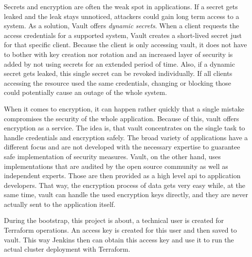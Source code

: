 Secrets and encryption are often the weak spot in applications.
If a secret gets leaked and the leak stays unnoticed, attackers could gain long term access to a system.
As a solution, Vault offers \emph{dynamic secrets}.
When a client requests the access credentials for a supported system, Vault creates a short-lived secret just for that specific client.
Because the client is only accessing vault, it does not have to bother with key creation nor rotation and an increased layer of security is added by not using secrets for an extended period of time.
Also, if a dynamic secret gets leaked, this single secret can be revoked individually.
If all clients accessing the resource used the same credentials, changing or blocking those could potentially cause an outage of the whole system.

When it comes to encryption, it can happen rather quickly that a single mistake compromises the security of the whole application.
Because of this, vault offers encryption as a service.
The idea is, that vault concentrates on the single task to handle credentials and encryption safely.
The broad variety of applications have a different focus and are not developed with the necessary expertise to guarantee safe implementation of security measures.
Vault, on the other hand, uses implementations that are audited by the open source community as well as independent experts.
Those are then provided as a high level \ac{api} to application developers.
That way, the encryption process of data gets very easy while, at the same time, vault can handle the used encryption keys directly, and they are never actually sent to the application itself. \cite{vaultproject.io}

During the bootstrap, this project is about, a technical user is created for Terraform operations.
An access key is created for this user and then saved to vault.
This way Jenkins then can obtain this access key and use it to run the actual cluster deployment with Terraform.

    
